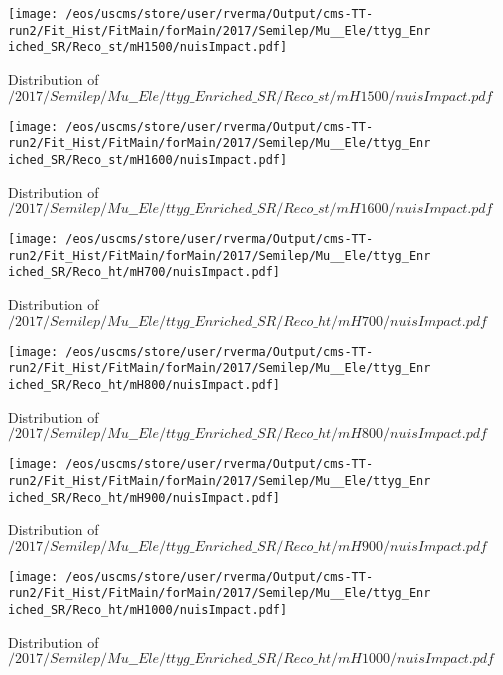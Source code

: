 \begin{figure}
\centering
\texttt{[image: /eos/uscms/store/user/rverma/Output/cms-TT-run2/Fit\_Hist/FitMain/forMain/2017/Semilep/Mu\_\_Ele/ttyg\_Enriched\_SR/Reco\_st/mH1500/nuisImpact.pdf]}
\caption{Distribution of $/2017/Semilep/Mu\_\_Ele/ttyg\_Enriched\_SR/Reco\_st/mH1500/nuisImpact.pdf$}
\end{figure}

\begin{figure}
\centering
\texttt{[image: /eos/uscms/store/user/rverma/Output/cms-TT-run2/Fit\_Hist/FitMain/forMain/2017/Semilep/Mu\_\_Ele/ttyg\_Enriched\_SR/Reco\_st/mH1600/nuisImpact.pdf]}
\caption{Distribution of $/2017/Semilep/Mu\_\_Ele/ttyg\_Enriched\_SR/Reco\_st/mH1600/nuisImpact.pdf$}
\end{figure}

\begin{figure}
\centering
\texttt{[image: /eos/uscms/store/user/rverma/Output/cms-TT-run2/Fit\_Hist/FitMain/forMain/2017/Semilep/Mu\_\_Ele/ttyg\_Enriched\_SR/Reco\_ht/mH700/nuisImpact.pdf]}
\caption{Distribution of $/2017/Semilep/Mu\_\_Ele/ttyg\_Enriched\_SR/Reco\_ht/mH700/nuisImpact.pdf$}
\end{figure}

\begin{figure}
\centering
\texttt{[image: /eos/uscms/store/user/rverma/Output/cms-TT-run2/Fit\_Hist/FitMain/forMain/2017/Semilep/Mu\_\_Ele/ttyg\_Enriched\_SR/Reco\_ht/mH800/nuisImpact.pdf]}
\caption{Distribution of $/2017/Semilep/Mu\_\_Ele/ttyg\_Enriched\_SR/Reco\_ht/mH800/nuisImpact.pdf$}
\end{figure}

\begin{figure}
\centering
\texttt{[image: /eos/uscms/store/user/rverma/Output/cms-TT-run2/Fit\_Hist/FitMain/forMain/2017/Semilep/Mu\_\_Ele/ttyg\_Enriched\_SR/Reco\_ht/mH900/nuisImpact.pdf]}
\caption{Distribution of $/2017/Semilep/Mu\_\_Ele/ttyg\_Enriched\_SR/Reco\_ht/mH900/nuisImpact.pdf$}
\end{figure}

\begin{figure}
\centering
\texttt{[image: /eos/uscms/store/user/rverma/Output/cms-TT-run2/Fit\_Hist/FitMain/forMain/2017/Semilep/Mu\_\_Ele/ttyg\_Enriched\_SR/Reco\_ht/mH1000/nuisImpact.pdf]}
\caption{Distribution of $/2017/Semilep/Mu\_\_Ele/ttyg\_Enriched\_SR/Reco\_ht/mH1000/nuisImpact.pdf$}
\end{figure}

